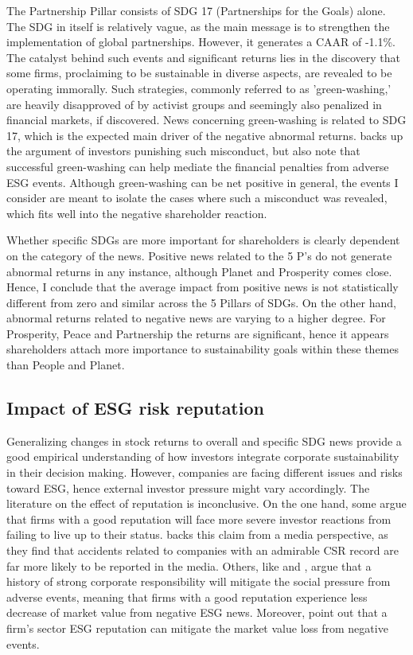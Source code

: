 The Partnership Pillar consists of SDG 17 (Partnerships for the Goals) alone. The SDG in itself is relatively vague, as the main message is to strengthen the implementation of global partnerships. However, it generates a CAAR of -1.1\%. The catalyst behind such events and significant returns lies in the discovery that some firms, proclaiming to be sustainable in diverse aspects, are revealed to be operating immorally. Such strategies, commonly referred to as 'green-washing,' are heavily disapproved of by activist groups and seemingly also penalized in financial markets, if discovered. News concerning green-washing is related to SDG 17, which is the expected main driver of the negative abnormal returns. \cite{Blancard_ESG_sentiment} backs up the argument of investors punishing such misconduct, but also note that successful green-washing can help mediate the financial penalties from adverse ESG events. Although green-washing can be net positive in general, the events I consider are meant to isolate the cases where such a misconduct was revealed, which fits well into the negative shareholder reaction.   

Whether specific SDGs are more important for shareholders is clearly dependent on the category of the news. Positive news related to the 5 P's do not generate abnormal returns in any instance, although Planet and Prosperity comes close. Hence, I conclude that the average impact from positive news is not statistically different from zero and similar across the 5 Pillars of SDGs. On the other hand, abnormal returns related to negative news are varying to a higher degree. For Prosperity, Peace and Partnership the returns are significant, hence it appears shareholders attach more importance to sustainability goals within these themes than People and Planet.    

\subsection{Impact of ESG risk reputation} \label{ESG_reputation}

Generalizing changes in stock returns to overall and specific SDG news provide a good empirical understanding of how investors integrate corporate sustainability in their decision making. However, companies are facing different issues and risks toward ESG, hence external investor pressure might vary accordingly. 
The literature on the effect of reputation is inconclusive. On the one hand, some argue that firms with a good reputation will face more severe investor reactions from failing to live up to their status. \cite{noNewsgoodnews} backs this claim from a media perspective, as they find that accidents related to companies with an admirable CSR record are far more likely to be reported in the media. Others, like \cite{flammer2013corporate} and \cite{godfrey2009relationship}, argue that a history of strong corporate responsibility will mitigate the social pressure from adverse events, meaning that firms with a good reputation experience less decrease of market value from negative ESG news. Moreover, \cite{Blancard_ESG_sentiment} point out that a firm's sector ESG reputation can mitigate the market value loss from negative events.  


